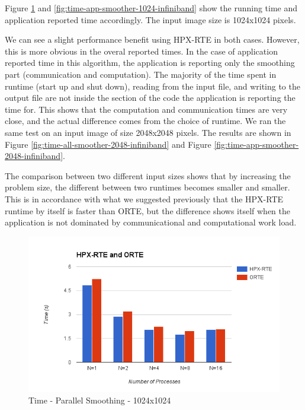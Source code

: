 Figure \ref{fig:time-all-smoother-1024-infiniband} and \ref{fig:time-app-smoother-1024-infiniband} show the running time and application reported time accordingly. The input image size is 1024x1024 pixels.

We can see a slight performance benefit using HPX-RTE in both cases. However, this is more obvious in the overal reported times. In the case of application reported time in this algorithm, the application is reporting only the smoothing part (communication and computation). The majority of the time spent in runtime (start up and shut down), reading from the input file, and writing to the output file are not inside the section of the code the application is reporting the time for. This shows that the computation and communication times are very close, and the actual difference comes from the choice of runtime. We ran the same test on an input image of size 2048x2048 pixels. The results are shown in Figure \ref{fig:time-all-smoother-2048-infiniband} and Figure \ref{fig:time-app-smoother-2048-infiniband}.

The comparison between two different input sizes shows that by increasing the problem size, the different between two runtimes becomes smaller and smaller. This is in accordance with what we suggested previously that the HPX-RTE runtime by itself is faster than ORTE, but the difference shows itself when the application is not dominated by communicational and computational work load.

\begin{figure}[h!]
  \centering
  \includegraphics[scale=0.7]{images/time-all-smoother-1024-infiniband.png}
  \caption[Time - Parallel Smoothing - 1024x1024]{Time - Parallel Smoothing - 1024x1024}
  \label{fig:time-all-smoother-1024-infiniband}
\end{figure}

